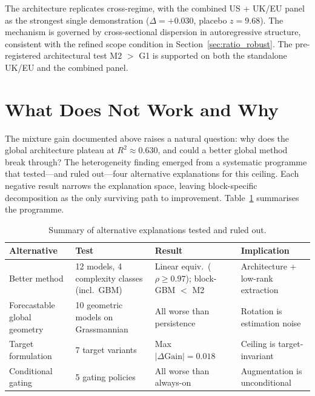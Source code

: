 \documentclass[11pt,a4paper]{article}
\begin{document}
The architecture replicates cross-regime, with the combined US + UK/EU panel as the strongest single demonstration ($\Delta = +0.030$, placebo $z = 9.68$). The mechanism is governed by cross-sectional dispersion in autoregressive structure, consistent with the refined scope condition in Section~\ref{sec:ratio_robust}. The pre-registered architectural test M2 $>$ G1 is supported on both the standalone UK/EU and the combined panel.


\section{What Does Not Work and Why}
\label{sec:falsification}

The mixture gain documented above raises a natural question: why does the global architecture plateau at $R^2 \approx 0.630$, and could a better global method break through? The heterogeneity finding emerged from a systematic programme that tested---and ruled out---four alternative explanations for this ceiling. Each negative result narrows the explanation space, leaving block-specific decomposition as the only surviving path to improvement. Table~\ref{tab:falsification} summarises the programme.

\begin{table}[H]
\centering
\caption{Summary of alternative explanations tested and ruled out.}
\label{tab:falsification}
\small
\begin{tabular}{p{3.5cm}p{4.5cm}p{3cm}p{3cm}}
\toprule
Alternative & Test & Result & Implication \\
\midrule
Better method & 12 models, 4 complexity classes (incl.\ GBM) & Linear equiv.\ ($\rho \geq 0.97$); block-GBM $< $ M2 & Architecture + low-rank extraction \\
Forecastable global geometry & 10 geometric models on Grassmannian & All worse than persistence & Rotation is estimation noise \\
Target formulation & 7 target variants & Max $|\Delta\text{Gain}| = 0.018$ & Ceiling is target-invariant \\
Conditional gating & 5 gating policies & All worse than always-on & Augmentation is unconditional \\
\bottomrule
\end{tabular}
\end{table}
\end{document}
